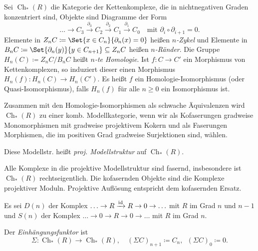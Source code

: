 \documentclass{cheat-sheet}
\DeclareMathOperator{\Ch}{Ch} %
\begin{document}
\begin{defn}
  Sei $\Ch_*(R)$ die Kategorie der Kettenkomplexe, die in nichtnegativen Graden konzentriert sind, \dh{} Objekte sind Diagramme der Form
  \[
    \ldots \to C_3 \xrightarrow{\partial_3} C_2 \xrightarrow{\partial_2} C_1 \xrightarrow{\partial_1} C_0
    \quad \text{mit $\partial_i \circ \partial_{i+1} = 0$.}
  \]
  Elemente in $Z_n C \coloneqq \Set{x \in C_n}{\partial_n(x) = 0}$ heißen \emph{$n$-Zykel} und Elemente in $B_n C \coloneqq \Set{\partial_n(y)}{y \in C_{n+1}} \subseteq Z_n C$ heißen \emph{$n$-Ränder}.
  Die Gruppe $H_n(C) \coloneqq Z_n C / B_n C$ heißt \emph{$n$-te Homologie}.
  Ist $f : C \to C'$ ein Morphismus von Kettenkomplexen, so induziert dieser einen Morphismus $H_n(f) : H_n(C) \to H_n(C')$.
  Es heißt $f$ ein Homologie-Isomorphismus (oder Quasi-Isomorphismus), falls $H_n(f)$ für alle $n \geq 0$ ein Isomorphismus ist.
\end{defn}

\begin{satz}
  Zusammen mit den Homologie-Isomorphismen als schwache Äquivalenzen wird $\Ch_*(R)$ zu einer komb. Modellkategorie, wenn wir als Kofaserungen gradweise Monomorphismen mit gradweise projektivem Kokern und als Faserungen Morphismen, die im positiven Grad gradweise Surjektionen sind, wählen.
\end{satz}

\begin{defn}
  Diese Modellstr. heißt \emph{proj. Modellstruktur} auf $\Ch_*(R)$.
\end{defn}

\begin{bem}
  Alle Komplexe in die projektive Modellstruktur sind fasernd, insbesondere ist $\Ch_*(R)$ rechtseigentlich.
  Die kofasernden Objekte sind die Komplexe projektiver Moduln.
  Projektive Auflösung entspricht dem kofasernden Ersatz.
\end{bem}


\begin{defn}
  Es sei $D(n)$ der Komplex $\ldots \to R \xrightarrow{\operatorname{id}} R \to 0 \to \ldots$ mit $R$ im Grad $n$ und $n-1$ und
  $S(n)$ der Komplex $\ldots \to 0 \to R \to 0 \to \ldots$ mit $R$ im Grad $n$.
\end{defn}

\begin{defn}
  Der \emph{Einhängungsfunktor} ist
  \[
    \Sigma : \Ch_*(R) \to \Ch_*(R), \quad
    (\Sigma C)_{n+1} \coloneqq C_n, \enspace (\Sigma C)_0 \coloneqq 0.
  \]
\end{defn}
\end{document}
